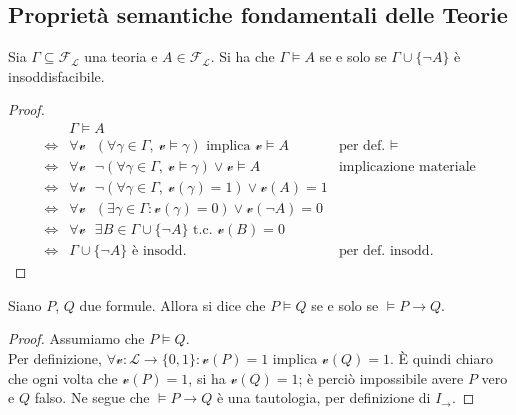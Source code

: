 \subsection{Proprietà semantiche fondamentali delle Teorie}

\begin{lemn}
\label{lem:conseguenza-teoria-insodd-formula}
Sia $\Gamma \subseteq \mathscr{F_L}$ una teoria e $A \in \mathscr{F_L}$. Si 
ha che $\Gamma \models A$ se e solo se $\Gamma \cup \{\neg A \}$ è insoddisfacibile. 
\end{lemn}

\begin{proof}
\begin{align*}
  & \Gamma \models A \\
  \iff & \forall \mathcal{v} ~~~ (\forall \gamma \in \Gamma,\ \mathcal{v} \models \gamma) \text{ implica } \mathcal{v} \models A & \text{per def. } \models \\
  \iff & \forall \mathcal{v} ~~~ \neg (\forall \gamma \in \Gamma,\ \mathcal{v} \models \gamma) \lor \mathcal{v}\models A & \text{implicazione materiale} \\
  \iff & \forall \mathcal{v} ~~~ \neg (\forall \gamma \in \Gamma,\ \mathcal{v}(\gamma) = 1) \lor \mathcal{v}(A) = 1\\
  \iff & \forall \mathcal{v} ~~~ (\exists \gamma \in \Gamma : \mathcal{v}(\gamma) = 0) \lor \mathcal{v}(\neg A) = 0 \\
  \iff & \forall \mathcal{v} ~~~ \exists B \in \Gamma \cup \{\neg A\} \text{ t.c. } \mathcal{v}(B) = 0  \\
  \iff & \Gamma \cup \{\neg A\} \text{ è insodd.} & \text{per def. insodd.}
\end{align*}
\end{proof}

\begin{lemn}
\label{lem:deduzione}
Siano $P$, $Q$ due formule. Allora si dice che $P \models Q$ se e solo se $\models P \rightarrow Q$. 
\end{lemn}
\begin{proof}
Assumiamo che $P \models Q$.\\
Per definizione, 
$\forall \mathcal{v}: \mathscr{L} \rightarrow \{0,1\}:\mathcal{v}(P) = 1$ implica $\mathcal{v}(Q) = 1$. 
È quindi chiaro che ogni volta che $\mathcal{v}(P) = 1$, si ha $\mathcal{v}(Q) = 1$; è perciò impossibile avere $P$ vero e $Q$ falso. Ne segue che $\models P\rightarrow Q$ è una tautologia, per definizione di $I_\rightarrow$.
\end{proof}

